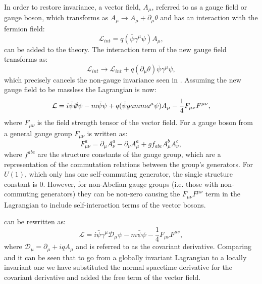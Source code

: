 In order to restore invariance, a vector field, $A_{\mu}$, referred to as a gauge field or gauge boson, which transforms as $A_{\mu}\rightarrow A_{\mu}+\partial_{\mu}\theta$ and has an interaction with the fermion field:
\begin{equation}
  \mathcal{L}_{int}=q(\bar{\psi}\gamma^{\mu}\psi) A_{\mu},
\end{equation}
 can be added to the theory. The interaction term of the new gauge field transforms as:
\begin{equation}
  \mathcal{L}_{int}\rightarrow \mathcal{L}_{int}+q(\partial_{\mu}\theta)\bar{\psi}\gamma^{\mu}\psi,
\end{equation}
which precisely cancels the non-gauge invariance seen in . Assuming the new gauge field to be massless the Lagrangian is now:
\begin{equation}
  \label{eq:diraclag}
  \mathcal{L}=i\bar{\psi}\slashed{\partial}\psi-m\bar{\psi}\psi+q(\bar{\psi}\gamma^{\mu}\psi) A_{\mu}-\frac{1}{4}F_{\mu\nu}F^{\mu\nu},
\end{equation}
where $F_{\mu\nu}$ is the field strength tensor of the vector field. For a gauge boson from a general gauge group $F_{\mu\nu}$ is written as:
\begin{equation}
F_{\mu\nu}^a=\partial_{\mu}A_{\nu}^a-\partial_{\nu}A_{\mu}^a+gf_{abc}A_{\mu}^{b}A_{\nu}^{c},
\end{equation}
where $f^{abc}$ are the structure constants of the gauge group, which are a representation of the commutation relations between the group's generators. For $U(1)$, which only has one self-commuting generator, the single structure constant is 0. However, for non-Abelian gauge groups (i.e. those with non-commuting generators) they can be non-zero causing the $F_{\mu\nu}F^{\mu\nu}$ term in the Lagrangian to include self-interaction terms of the vector bosons.

 can be rewritten as:
\begin{equation}
  \label{eq:localdiraclagrangian}
  \mathcal{L}=i\bar{\psi}\gamma^{\mu}\mathcal{D}_{\mu}\psi-m\bar{\psi}\psi-\frac{1}{4}F_{\mu\nu}F^{\mu\nu},
\end{equation}
where $\mathcal{D}_{\mu}=\partial_{\mu}+iqA_{\mu}$ and is referred to as the covariant derivative. Comparing  and  it can be seen that to go from a globally invariant Lagrangian to a locally invariant one we have substituted the normal spacetime derivative for the covariant derivative and added the free term of the vector field.

